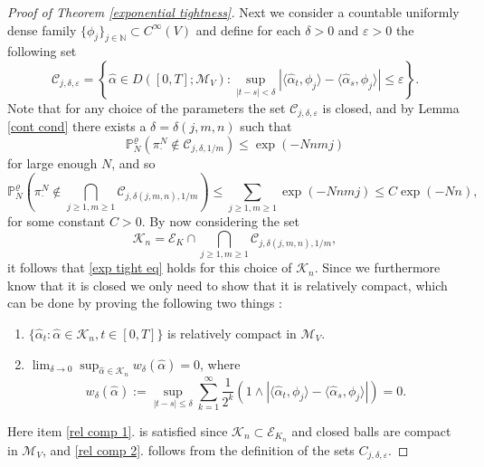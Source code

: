 \documentclass[11pt]{article}
\numberwithin{equation}{section}
\theoremstyle{definition}
\theoremstyle{plain}
\newcommand{\p}{\mathbb{P}}
\begin{document}
\begin{proof}[Proof of Theorem \ref{exponential tightness}]
Next we consider a countable uniformly dense family $\{\phi_j\}_{j\in\mathbb{N}} \subset C^\infty(V)$ and define for each $\delta>0$ and $\varepsilon>0$ the following set
    \begin{equation}
        \mathcal{C}_{j,\delta,\varepsilon} = \left\{\widehat{\alpha} \in D([0,T];\mathcal{M}_V) : \sup_{|t-s|<\delta} \left|\langle \widehat{\alpha}_t, \phi_j\rangle - \langle \widehat{\alpha}_s,\phi_j\rangle\right| \leq \varepsilon \right\}.
    \end{equation}
Note that for any choice of the parameters the set $\mathcal{C}_{j,\delta,\varepsilon}$ is closed, and by Lemma \ref{cont cond} there exists a $\delta = \delta(j,m,n)$ such that 
    \begin{equation}
        \p^\varrho_N(\pi^N_{\cdot} \notin \mathcal{C}_{j,\delta,1/m} ) \leq \exp(-Nnmj)
    \end{equation}
for large enough $N$, and so 
    \begin{equation}
        \p^\varrho_N\left(\pi^N_{\cdot} \notin \bigcap_{j\geq 1, m\geq 1} \mathcal{C}_{j,\delta(j,m,n),1/m}  \right) \leq \sum_{j\geq 1, m\geq 1} \exp(-Nnmj) \leq C \exp(-Nn),
    \end{equation}
for some constant $C>0$. By now considering the set
    \begin{equation}
        \mathcal{K}_n =  \mathcal{E}_K \cap \bigcap_{j\geq 1, m\geq 1} \mathcal{C}_{j,\delta(j,m,n),1/m},
    \end{equation}
it follows that \eqref{exp tight eq} holds for this choice of $\mathcal{K}_n$. Since we furthermore know that it is closed we only need to show that it is relatively compact, which can be done by proving the following two things \cite[Proposition 4.1.2]{KipnisLandim}:
    \begin{enumerate}
        \item\label{rel comp 1} $\{\widehat{\alpha}_t : \widehat{\alpha} \in \mathcal{K}_n, t\in[0,T]\}$ is relatively compact in $\mathcal{M}_V$. 
        \item\label{rel comp 2} $\lim_{\delta\to 0} \sup_{\widehat{\alpha} \in \mathcal{K}_n} w_\delta(\widehat{\alpha}) = 0$, where 
            \begin{equation}
                w_\delta(\widehat{\alpha} ) := \sup_{|t-s|\leq \delta} \sum_{k=1}^\infty \frac{1}{2^k}\left( 1\wedge |\langle \widehat{\alpha}_t, \phi_j\rangle - \langle \widehat{\alpha}_s, \phi_j \rangle |\right)=0.
            \end{equation}
    \end{enumerate}
Here item \ref{rel comp 1}. is satisfied since $\mathcal{K}_n \subset \mathcal{E}_{K_n}$  and closed balls are compact in $\mathcal{M}_V$, and \ref{rel comp 2}. follows from the definition of the sets $C_{j,\delta,\varepsilon}$.
\end{proof}
\end{document}
